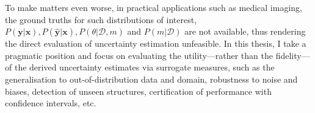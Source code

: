 To make matters even worse, in practical applications such as medical imaging, the ground truths for such distributions of interest, $P(\mathbf{y}|\mathbf{x}), P(\hat{\mathbf{y}}|\mathbf{x}), P(\theta|\mathcal{D}, m)$ and $P(m|\mathcal{D})$ are not available, thus rendering the direct evaluation of uncertainty estimation unfeasible. In this thesis, I take a pragmatic position and focus on evaluating the utility---rather than the fidelity---of the derived uncertainty estimates via surrogate measures, such as the generalisation to out-of-distribution data and domain, robustness to noise and biases, detection of unseen structures, certification of performance with confidence intervals, etc. 




 


